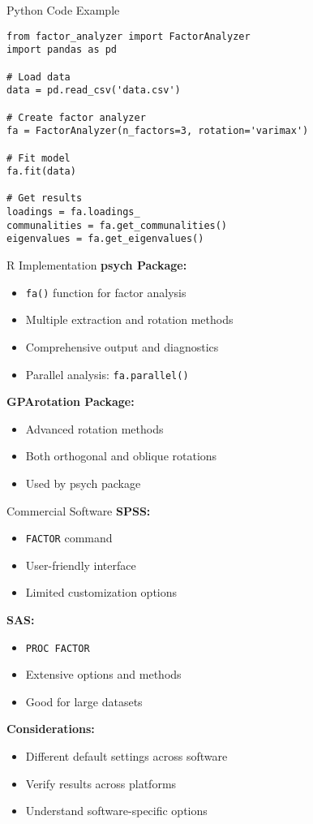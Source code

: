 \documentclass[aspectratio=169]{beamer}
\begin{document}
\begin{frame}[fragile]{Python Code Example}
\begin{verbatim}
from factor_analyzer import FactorAnalyzer
import pandas as pd

# Load data
data = pd.read_csv('data.csv')

# Create factor analyzer
fa = FactorAnalyzer(n_factors=3, rotation='varimax')

# Fit model
fa.fit(data)

# Get results
loadings = fa.loadings_
communalities = fa.get_communalities()
eigenvalues = fa.get_eigenvalues()
\end{verbatim}
\end{frame}

\begin{frame}{R Implementation}
  \textbf{psych Package:}
  \begin{itemize}
    \item \texttt{fa()} function for factor analysis
    \item Multiple extraction and rotation methods
    \item Comprehensive output and diagnostics
    \item Parallel analysis: \texttt{fa.parallel()}
  \end{itemize}
  
  \textbf{GPArotation Package:}
  \begin{itemize}
    \item Advanced rotation methods
    \item Both orthogonal and oblique rotations
    \item Used by psych package
  \end{itemize}
\end{frame}

\begin{frame}{Commercial Software}
  \textbf{SPSS:}
  \begin{itemize}
    \item \texttt{FACTOR} command
    \item User-friendly interface
    \item Limited customization options
  \end{itemize}
  
  \textbf{SAS:}
  \begin{itemize}
    \item \texttt{PROC FACTOR}
    \item Extensive options and methods
    \item Good for large datasets
  \end{itemize}
  
  \textbf{Considerations:}
  \begin{itemize}
    \item Different default settings across software
    \item Verify results across platforms
    \item Understand software-specific options
  \end{itemize}
\end{frame}
\end{document}
